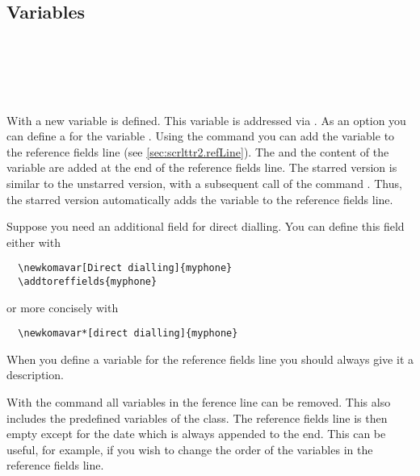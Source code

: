 \subsection{Variables}
\label{sec:scrlttr2.variables}

%

\begin{Declaration}
  \\
  \\
  \\
  \\
\end{Declaration}
%
%
%
With  a new variable is defined. This variable is
addressed via . As an option you can define a
 for the variable . Using the command
 you can add the variable  to the
reference fields line (see \autoref{sec:scrlttr2.refLine}). The
 and the content of the variable are added at the
end of the reference fields line. The starred version
 is similar to the unstarred version, with a
subsequent call of the command . Thus, the
starred version automatically adds the variable to the reference
fields line.
\begin{Example}
  Suppose you need an additional field for direct dialling. You can
  define this field either with
\begin{lstlisting}
  \newkomavar[Direct dialling]{myphone}
  \addtoreffields{myphone}
\end{lstlisting}
  or more concisely with
\begin{lstlisting}
  \newkomavar*[direct dialling]{myphone}
\end{lstlisting}

\end{Example}
When you define a variable for the reference fields line you should always
give it a description.

With the command  all variables in the ference
line can be removed. This also includes the predefined variables of
the class. The reference fields line is then empty except for the date
which is always appended to the end. This can be useful, for example,
if you wish to change the order of the variables in the reference
fields line.

